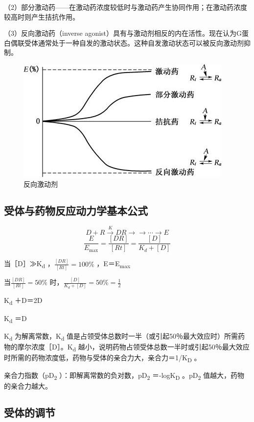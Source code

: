 （2）部分激动药------在激动药浓度较低时与激动药产生协同作用；在激动药浓度较高时则产生拮抗作用。

（3）反向激动药（inverse
agonist）具有与激动剂相反的内在活性。现在认为G蛋白偶联受体通常处于一种自发的激动状态。这种自发激动状态可以被反向激动剂抑制。

\begin{figure}[!htbp]
 \centering
 \includegraphics{./images/Image00013.jpg}
 \captionsetup{justification=centering}
 \caption{反向激动剂}
 \label{fig2-9}
  \end{figure} 

\subsection{受体与药物反应动力学基本公式}

$$D+R\xrightarrow{K}DR\rightarrow\rightarrow\cdots\rightarrow E$$
$$\frac{E}{E_{\text{max}}}=\frac{[DR]}{[Rt]}=\frac{[D]}{K_d+[D]}$$

当［D］≫K\textsubscript{d} ，$\frac{[DR]}{[Rt]}=100\%$
，E＝E\textsubscript{max}

当$\frac{[DR]}{[Rt]}=50\%$
时，$\frac{[D]}{K_d+[D]}=50\%=\frac{1}{2}$

K\textsubscript{d} ＋D＝2D

K\textsubscript{d} ＝D

K\textsubscript{d} 为解离常数，K\textsubscript{d}
值是占领受体总数时一半（或引起50％最大效应时）所需药物的摩尔浓度［D］。K\textsubscript{d}
越小，说明药物占领受体总数一半时或引起50％最大效应时所需的药物浓度低，药物与受体的亲合力大，亲合力＝1/K\textsubscript{D}
。

亲合力指数（pD\textsubscript{2}
）：即解离常数的负对数，pD\textsubscript{2} ＝-logK\textsubscript{D}
。pD\textsubscript{2} 值越大，药物的亲合力越大。

\subsection{受体的调节}

